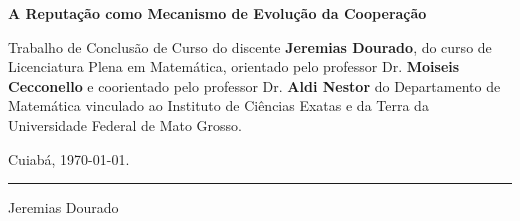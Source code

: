 

\setcounter{page}{2}

\begin{center}
\textbf{\large A Reputação como Mecanismo de Evolução da Cooperação}
\end{center}


\vspace{9cm}

\begin{flushright}

\begin{minipage}{8cm}
Trabalho de Conclusão de Curso do discente \textbf{Jeremias Dourado}, do curso de Licenciatura Plena em Matemática, orientado pelo professor Dr. \textbf{Moiseis Cecconello} e coorientado pelo professor Dr. \textbf{Aldi Nestor} do Departamento de Matemática vinculado ao Instituto de Ciências Exatas e da Terra da Universidade Federal de Mato Grosso.

\vspace{0.5cm}

\begin{flushright}

Cuiabá, \today.

\end{flushright}
\end{minipage}

\vspace{4cm}

\end{flushright}

\begin{center}

{\rule[0 ex]{8cm}{0.01cm}}

Jeremias Dourado

\end{center}


